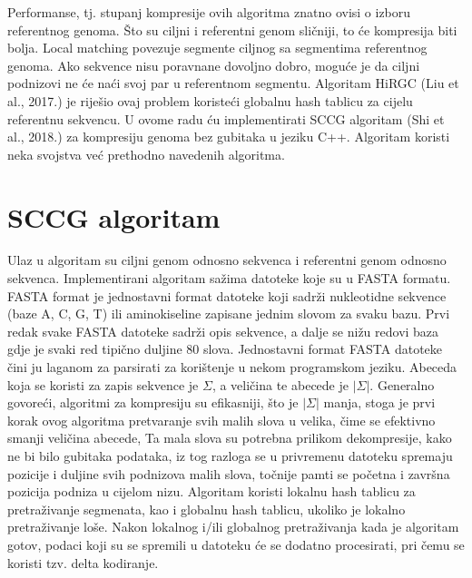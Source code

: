 \documentclass[times, utf8, diplomski]{fer}
\begin{document}
Performanse, tj. stupanj kompresije ovih algoritma znatno ovisi o izboru referentnog genoma. Što su ciljni i referentni genom sličniji, to će kompresija biti bolja. Local matching povezuje segmente ciljnog sa segmentima referentnog genoma. Ako sekvence nisu poravnane dovoljno dobro, moguće je da ciljni podnizovi ne će naći svoj par u referentnom segmentu. Algoritam HiRGC (Liu et al., 2017.) je riješio ovaj problem koristeći globalnu hash tablicu za cijelu referentnu sekvencu. U ovome radu ću implementirati SCCG algoritam (Shi et al., 2018.) za kompresiju genoma bez gubitaka u jeziku C++. Algoritam koristi neka svojstva već prethodno navedenih algoritma.

\chapter{SCCG algoritam}
Ulaz u algoritam su ciljni genom odnosno sekvenca i referentni genom odnosno sekvenca. Implementirani algoritam sažima datoteke koje su u FASTA formatu. FASTA format je jednostavni format datoteke koji sadrži nukleotidne sekvence (baze A, C, G, T) ili aminokiseline zapisane jednim slovom za svaku bazu. Prvi redak svake FASTA datoteke sadrži opis sekvence, a dalje se nižu redovi baza gdje je svaki red tipično duljine 80 slova. Jednostavni format FASTA datoteke čini ju laganom za parsirati za korištenje u nekom programskom jeziku. Abeceda koja se koristi za zapis sekvence je $\Sigma$, a veličina te abecede je $|\Sigma|$. Generalno govoreći, algoritmi za kompresiju su efikasniji, što je $|\Sigma|$ manja, stoga je prvi korak ovog algoritma pretvaranje svih malih slova u velika, čime se efektivno smanji veličina abecede, Ta mala slova su potrebna prilikom dekompresije, kako ne bi bilo gubitaka podataka, iz tog razloga se u privremenu datoteku spremaju pozicije i duljine svih podnizova malih slova, točnije pamti se početna i završna pozicija podniza u cijelom nizu. Algoritam koristi lokalnu hash tablicu za pretraživanje segmenata, kao i globalnu hash tablicu, ukoliko je lokalno pretraživanje loše. Nakon lokalnog i/ili globalnog pretraživanja kada je algoritam gotov, podaci koji su se spremili u datoteku će se dodatno procesirati, pri čemu se koristi tzv. delta kodiranje. 
\end{document}
